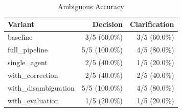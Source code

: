 \begin{table}[htbp]
\centering
\caption{Ambiguous Accuracy}
\label{tab:acc-ambig}
\begin{tabular}{l rr}
\toprule
Variant & Decision & Clarification \\
\midrule
  baseline & 3/5 (60.0\%) & 3/5 (60.0\%) \\
  full\_pipeline & 5/5 (100.0\%) & 4/5 (80.0\%) \\
  single\_agent & 2/5 (40.0\%) & 1/5 (20.0\%) \\
  with\_correction & 2/5 (40.0\%) & 2/5 (40.0\%) \\
  with\_disambiguation & 5/5 (100.0\%) & 4/5 (80.0\%) \\
  with\_evaluation & 1/5 (20.0\%) & 1/5 (20.0\%) \\
\bottomrule
\end{tabular}
\end{table}
